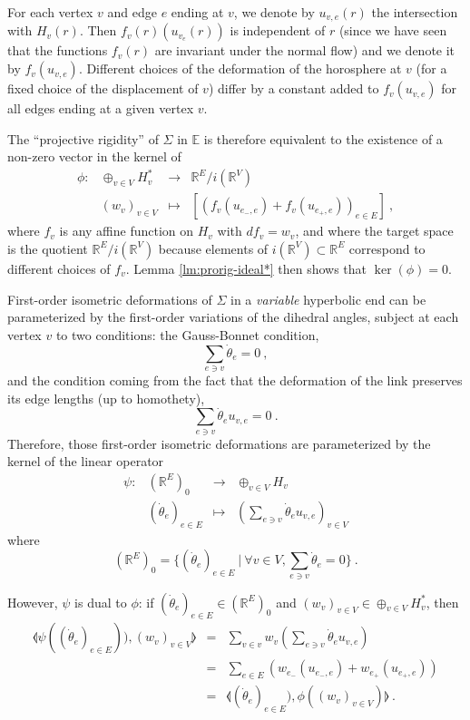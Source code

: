 \documentclass[notitlepage,twoside,a4paper]{amsart}
\theoremstyle{named}
\newcommand{\R}{{\mathbb R}}
\newcommand{\bE}{{\mathbb E}}
\begin{document}
For each vertex $v$ and edge $e$ ending at $v$, we denote by $u_{v,e}(r)$ the intersection with $H_v(r)$. Then $f_v(r)(u_{v_e}(r))$ is independent of $r$ (since we have seen that the functions $f_v(r)$ are invariant under the normal flow) and we denote it by $f_v(u_{v,e})$. Different choices of the deformation of the horosphere at $v$ (for a fixed choice of the displacement of $v$) differ by a constant added to $f_v(u_{v,e})$ for all edges ending at a given vertex $v$.

The ``projective rigidity'' of $\Sigma$ in $\bE$ is therefore equivalent to the existence of a non-zero vector in the kernel of
  $$
  \begin{array}{cccc}
       \phi: & \oplus_{v\in V}H_v^* & \to & \R^E/i(\R^V) \\
       & (w_v)_{v\in V} & \mapsto & [(f_v(u_{e_-, e})+f_v(u_{e_+,e}))_{e\in E}]~,
  \end{array}
  $$
where $f_v$ is any affine function on $H_v$ with $df_v=w_v$, and where the target space is the quotient $\R^E/i(\R^V)$ because elements of $i(\R^V)\subset \R^E$ correspond to different choices of $f_v$. Lemma \ref{lm:prorig-ideal*} then shows that $\ker(\phi)=0$.

First-order isometric deformations of $\Sigma$ in a {\em variable} hyperbolic end can be parameterized by the first-order variations of the dihedral angles, subject at each vertex $v$ to two conditions: the Gauss-Bonnet condition,
$$ \sum_{e\ni v} \dot \theta_e=0~, $$
and the condition coming from the fact that the deformation of the link preserves its edge lengths (up to homothety),
$$ \sum_{e\ni v} \dot \theta_e u_{v,e}=0~. $$
Therefore, those first-order isometric deformations are parameterized by the kernel of the linear operator
$$
\begin{array}{cccc}
  \psi: & (\R^E)_0 & \to & \oplus_{v\in V}H_v \\
        & (\dot \theta_e)_{e\in E} & \mapsto & (\sum_{e\ni v} \dot \theta_e u_{v,e})_{v\in V}
\end{array}
$$
where
$$ (\R^E)_0 = \{ (\dot\theta_e)_{e\in E}~|~ \forall v\in V, \sum_{e\ni v}\dot\theta_e=0 \}~. $$

However, $\psi$ is dual to $\phi$: if $(\dot \theta_e)_{e\in E}\in (\R^E)_0$ and $(w_v)_{v\in V}\in \oplus_{v\in V} H^*_v$, then
\begin{eqnarray*}
  \llangle\psi((\dot \theta_e)_{e\in E})), (w_v)_{v\in V}\rrangle & = & \sum_{v\in v} w_v(\sum_{e\ni v}\dot\theta_e u_{v,e}) \\
                                                                 & = & \sum_{e\in E} (w_{e_-}(u_{e_-,e})+w_{e_+}(u_{e_+,e})) \\
  & = & \llangle (\dot \theta_e)_{e\in E}), \phi((w_v)_{v\in V})\rrangle~. 
\end{eqnarray*}
\end{document}
